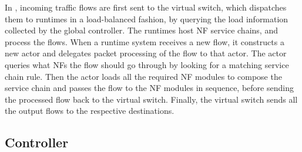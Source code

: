 In \nfactor, incoming traffic flows are first sent to the virtual switch, which dispatches them to runtimes in a load-balanced fashion, by querying the load information collected by the global controller. The runtimes host NF service chains, and process the flows. When a runtime system receives a new flow, it constructs a new actor and delegates packet processing of the flow to that actor. The actor queries what NFs the flow should go through by looking for a matching service chain rule. Then the actor loads all the required NF modules to compose the service chain and passes the flow to the NF modules in sequence, before sending the processed flow back to the virtual switch. Finally, the virtual switch sends all the output flows to the respective destinations. 


  


\subsection{Controller}
\label{sec:controller}

